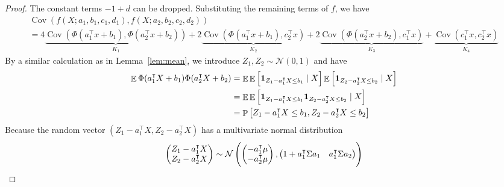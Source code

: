 \documentclass[oneside, article]{memoir}
\DeclareMathOperator{\expect}{\mathbb{E}}
\DeclareMathOperator{\probability}{\mathbb{P}}
\DeclareMathOperator{\Cov}{\operatorname{Cov}}
\begin{document}
\begin{proof}
  The constant terms \(-1+d\) can be dropped.
  Substituting the remaining terms of \(f\), we have
  \begin{multline}
    \Cov (f(X; a_1, b_1, c_1, d_1), f(X; a_2, b_2, c_2, d_2) )
    \\
    =
    4\underbrace{\Cov(\Phi(a_1^\intercal x + b_1), \Phi(a_2^\intercal x + b_2))}_{K_1} 
    +2\underbrace{\Cov(\Phi(a_1^\intercal x + b_1), c_2^\intercal x)}_{K_2} 
    +2\underbrace{\Cov(\Phi(a_2^\intercal x + b_2), c_1^\intercal x)}_{K_3} 
    +\underbrace{\Cov(c_1^\intercal x, c_2^\intercal x)}_{K_4} 
  \end{multline}
  By a similar calculation as in Lemma~\ref{lem:mean}, we introduce \(Z_1, Z_2 \sim \mathcal N(0, 1)\) and have
  \begin{align}
    \expect \Phi(a_1^\intercal X + b_1) \Phi(a_2^\intercal X + b_2)
    &= 
    \expect \expect\sbr{
      \bm1_{Z_1 - a_1^\intercal X \leq b_1} \mid X
    }
    \expect\sbr{
      \bm1_{Z_2 - a_2^\intercal X \leq b_2} \mid X
    }
    \\
    &= 
    \expect \expect\sbr{
      \bm1_{Z_1 - a_1^\intercal X \leq b_1} \bm1_{Z_2 - a_2^\intercal X \leq b_2} \mid X
    }
    \\
    &= 
    \probability\sbr{
      Z_1 - a_1^\intercal X \leq b_1, Z_2 - a_2^\intercal X \leq b_2
    }
    \label{eq:joint-prob}
  \end{align}
  Because the random vector \((Z_1 - a_1^\intercal X, Z_2 - a_2^\intercal X)\) has a multivariate normal distribution
  \begin{align}
    \begin{pmatrix}
      Z_1 - a_1^\intercal X
      \\
      Z_2 - a_2^\intercal X
    \end{pmatrix}
    \sim
    \mathcal{N}\del{
      \begin{pmatrix}
        -a_1^\intercal \mu
        \\
        -a_2^\intercal \mu
      \end{pmatrix},
      \begin{pmatrix}
        1 + a_1^\intercal \Sigma a_1
        &
        a_1^\intercal \Sigma a_2
        \\

\end{pmatrix}}
\end{align}
\end{proof}
\end{document}
